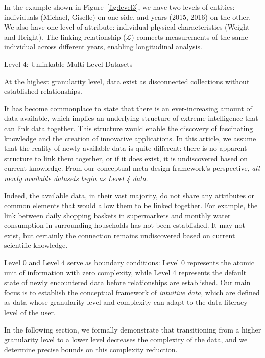\documentclass[]{hdsr}
\makeatletter
\def\subsection{\@startsection{subsection}{2}%
  \z@{.5\linespacing\@plus.7\linespacing}{.5\linespacing}%
  {\normalfont\bfseries}}
\theoremstyle{plain}      %
\theoremstyle{definition} %
\theoremstyle{remark}     %
\makeatother
\begin{document}
\noindent In the example shown in Figure~\ref{fig:level3}, we have two levels of entities: individuals (Michael, Giselle) on one side, and years (2015, 2016) on the other. We also have one level of attribute: individual physical characteristics (Weight and Height). The linking relationship ($\mathcal{L}$) connects measurements of the same individual across different years, enabling longitudinal analysis.

\subsection{Level 4: Unlinkable Multi-Level Datasets}

At the highest granularity level, data exist as disconnected collections without established relationships.

It has become commonplace to state that there is an ever-increasing amount of data available, which implies an underlying structure of extreme intelligence that can link data together. This structure would enable the discovery of fascinating knowledge and the creation of innovative applications. In this article, we assume that the reality of newly available data is quite different: there is no apparent structure to link them together, or if it does exist, it is undiscovered based on current knowledge. From our conceptual meta-design framework's perspective, \emph{all newly available datasets begin as Level 4 data}.

Indeed, the available data, in their vast majority, do not share any attributes or common elements that would allow them to be linked together. For example, the link between daily shopping baskets in supermarkets and monthly water consumption in surrounding households has not been established. It may not exist, but certainly the connection remains undiscovered based on current scientific knowledge.

Level 0 and Level 4 serve as boundary conditions: Level 0 represents the atomic unit of information with zero complexity, while Level 4 represents the default state of newly encountered data before relationships are established. Our main focus is to establish the conceptual framework of \emph{intuitive data}, which are defined as data whose granularity level and complexity can adapt to the data literacy level of the user.

In the following section, we formally demonstrate that transitioning from a higher granularity level to a lower level decreases the complexity of the data, and we determine precise bounds on this complexity reduction.
\end{document}
